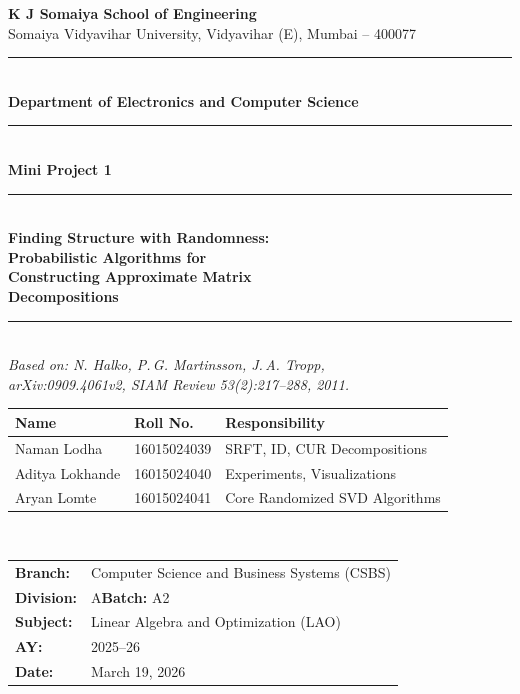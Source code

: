 \documentclass[12pt,a4paper]{article}
\begin{document}

\begin{titlepage}
\begin{center}
  \vspace*{0.5cm}
  {\large\bfseries K J Somaiya School of Engineering}\\[0.3em]
  {\normalsize Somaiya Vidyavihar University, Vidyavihar (E), Mumbai -- 400077}\\[0.3em]
  \noindent\rule{\linewidth}{1.2pt}\\[0.6em]
  {\normalsize\bfseries Department of Electronics and Computer Science}\\[0.4em]
  \noindent\rule{\linewidth}{0.6pt}\\[1.5em]

  {\Large\bfseries\color{deepblue} Mini Project 1}\\[0.8em]
  \noindent\rule{0.6\linewidth}{0.8pt}\\[0.8em]
  {\LARGE\bfseries\color{deepblue}
    Finding Structure with Randomness:\\[0.3em]
    Probabilistic Algorithms for\\[0.3em]
    Constructing Approximate Matrix\\[0.3em]
    Decompositions}\\[0.8em]
  \noindent\rule{0.6\linewidth}{0.8pt}\\[0.5em]
  {\normalsize\itshape
    Based on: N. Halko, P.\,G. Martinsson, J.\,A. Tropp,\\
    arXiv:0909.4061v2, SIAM Review 53(2):217--288, 2011.}\\[2em]

  \begin{tabular}{lll}
    \toprule
    \textbf{Name}           & \textbf{Roll No.}  & \textbf{Responsibility}\\
    \midrule
    Naman Lodha             & 16015024039 & SRFT, ID, CUR Decompositions\\
    Aditya Lokhande         & 16015024040 & Experiments, Visualizations\\
    Aryan Lomte             & 16015024041 & Core Randomized SVD Algorithms\\
    \bottomrule
  \end{tabular}\\[1.2em]

  \begin{tabular}{ll}
    \textbf{Branch:}   & Computer Science and Business Systems (CSBS)\\
    \textbf{Division:} & A\quad \textbf{Batch:} A2\\
    \textbf{Subject:}  & Linear Algebra and Optimization (LAO)\\
    \textbf{AY:}       & 2025--26\\
    \textbf{Date:}     & March 19, 2026\\
  \end{tabular}
\end{center}
\end{titlepage}
\end{document}

